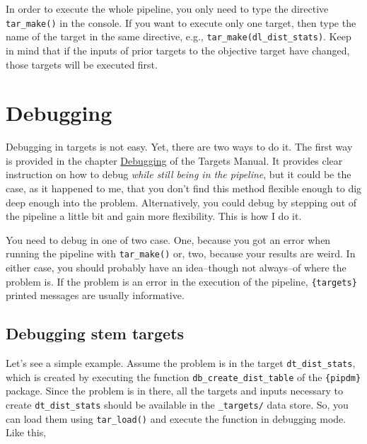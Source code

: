 \documentclass[
]{book}
\begin{document}
In order to execute the whole pipeline, you only need to type the directive
\texttt{tar\_make()} in the console. If you want to execute only one target, then type
the name of the target in the same directive, e.g., \texttt{tar\_make(dl\_dist\_stats)}.
Keep in mind that if the inputs of prior targets to the objective target have
changed, those targets will be executed first.

\hypertarget{debugging}{%
\section{Debugging}\label{debugging}}

Debugging in targets is not easy. Yet, there are two ways to do it. The first
way is provided in the chapter
\href{https://books.ropensci.org/targets/debugging.html}{Debugging} of the Targets
Manual. It provides clear instruction on how to debug \emph{while still being in the
pipeline}, but it could be the case, as it happened to me, that you don't find
this method flexible enough to dig deep enough into the problem. Alternatively,
you could debug by stepping out of the pipeline a little bit and gain more
flexibility. This is how I do it.

You need to debug in one of two case. One, because you got an error when running
the pipeline with \texttt{tar\_make()} or, two, because your results are weird. In
either case, you should probably have an idea--though not always--of where the
problem is. If the problem is an error in the execution of the pipeline,
\texttt{\{targets\}} printed messages are usually informative.

\hypertarget{debugging-stem-targets}{%
\subsection*{Debugging stem targets}\label{debugging-stem-targets}}

Let's see a simple example. Assume the problem is in the target \texttt{dt\_dist\_stats},
which is created by executing the function \texttt{db\_create\_dist\_table} of the
\texttt{\{pipdm\}} package. Since the problem is in there, all the targets and inputs
necessary to create \texttt{dt\_dist\_stats} should be available in the \texttt{\_targets/} data
store. So, you can load them using \texttt{tar\_load()} and execute the function in
debugging mode. Like this,
\end{document}
